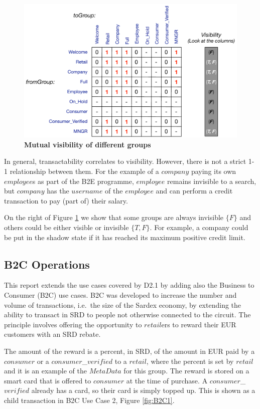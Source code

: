 \begin{figure}[H]
\centering
\includegraphics[width=12cm]{Figures/Visibility}
\caption{\small\textbf{Mutual visibility of different groups}}
\label{fig:visibility}
\vspace{-0.5cm}
\end{figure}

In general, transactability correlates to visibility. However, there is not a strict 1-1 relationship between them. For the example of a $company$ paying its own $employee$s as part of the B2E programme, $employee$ remains invisible to a search, but $company$ has the $username$ of the $employee$ and can perform a credit transaction to pay (part of) their salary.

On the right of Figure \ref{fig:visibility} we show that some groups are always invisible $\{ F \}$ and others could be either visible or invisible $\{T, F\}$. For example, a company could be put in the shadow state if it has reached its maximum positive credit limit.

\subsection{B2C Operations}
\label{b2cOperations}
This report extends the use cases covered by D2.1 by adding also the Business to Consumer (B2C) use cases. B2C was developed to increase the number and volume of transactions, i.e.\ the size of the Sardex economy, by extending the ability to transact in SRD to people not otherwise connected to the circuit. The principle involves offering the opportunity to $retail$ers to reward their EUR customers with an SRD rebate.

The amount of the reward is a percent, in SRD, of the amount in EUR paid by a $consumer$ or a $consumer$\_$verified$ to a $retail$, where the percent is set by $retail$ and it is an example of the $MetaData$ for this group. The reward is stored on a smart card that is offered to $consumer$ at the time of purchase. A $consumer$\_$verified$ already has a card, so their card is simply topped up. This is shown as a child transaction in B2C Use Case 2, Figure \ref{fig:B2C1}.

